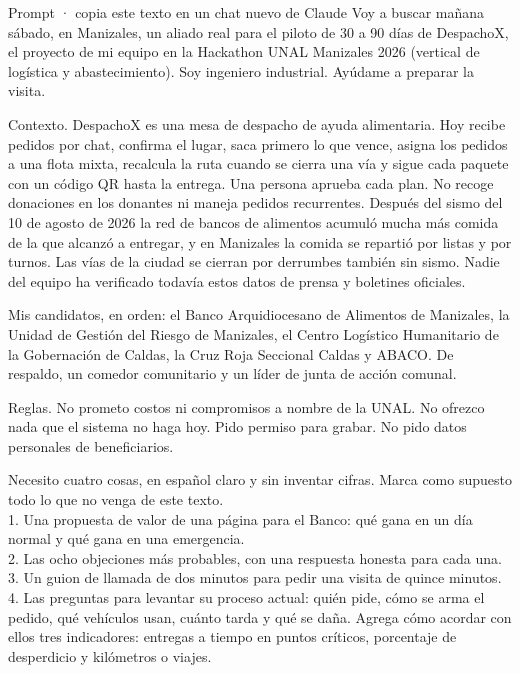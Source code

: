 \documentclass[11pt,letterpaper,parskip=half-]{scrartcl}
\begin{document}
\begin{plantilla}{Prompt · copia este texto en un chat nuevo de Claude}
Voy a buscar mañana sábado, en Manizales, un aliado real para el piloto de 30 a 90 días de DespachoX, el proyecto de mi equipo en la Hackathon UNAL Manizales 2026 (vertical de logística y abastecimiento). Soy ingeniero industrial. Ayúdame a preparar la visita.

Contexto. DespachoX es una mesa de despacho de ayuda alimentaria. Hoy recibe pedidos por chat, confirma el lugar, saca primero lo que vence, asigna los pedidos a una flota mixta, recalcula la ruta cuando se cierra una vía y sigue cada paquete con un código QR hasta la entrega. Una persona aprueba cada plan. No recoge donaciones en los donantes ni maneja pedidos recurrentes. Después del sismo del 10 de agosto de 2026 la red de bancos de alimentos acumuló mucha más comida de la que alcanzó a entregar, y en Manizales la comida se repartió por listas y por turnos. Las vías de la ciudad se cierran por derrumbes también sin sismo. Nadie del equipo ha verificado todavía estos datos de prensa y boletines oficiales.

Mis candidatos, en orden: el Banco Arquidiocesano de Alimentos de Manizales, la Unidad de Gestión del Riesgo de Manizales, el Centro Logístico Humanitario de la Gobernación de Caldas, la Cruz Roja Seccional Caldas y ABACO. De respaldo, un comedor comunitario y un líder de junta de acción comunal.

Reglas. No prometo costos ni compromisos a nombre de la UNAL. No ofrezco nada que el sistema no haga hoy. Pido permiso para grabar. No pido datos personales de beneficiarios.

Necesito cuatro cosas, en español claro y sin inventar cifras. Marca como supuesto todo lo que no venga de este texto.\\
1. Una propuesta de valor de una página para el Banco: qué gana en un día normal y qué gana en una emergencia.\\
2. Las ocho objeciones más probables, con una respuesta honesta para cada una.\\
3. Un guion de llamada de dos minutos para pedir una visita de quince minutos.\\
4. Las preguntas para levantar su proceso actual: quién pide, cómo se arma el pedido, qué vehículos usan, cuánto tarda y qué se daña. Agrega cómo acordar con ellos tres indicadores: entregas a tiempo en puntos críticos, porcentaje de desperdicio y kilómetros o viajes.
\end{plantilla}
\end{document}
